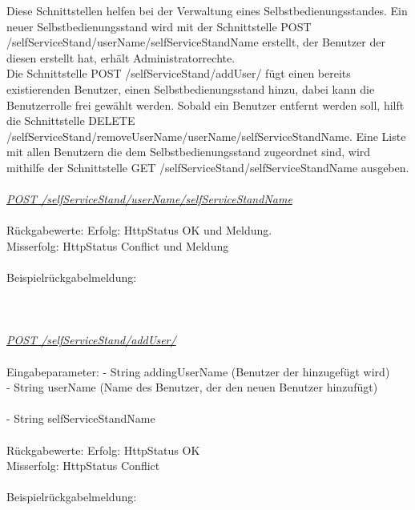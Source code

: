 Diese Schnittstellen helfen bei der Verwaltung eines Selbstbedienungsstandes. Ein neuer Selbstbedienungsstand wird mit der Schnittstelle POST /selfServiceStand/{userName}/{selfServiceStandName} erstellt, der Benutzer der diesen erstellt hat, erhält Administratorrechte.\\ Die Schnittstelle POST /selfServiceStand/addUser/ fügt einen bereits existierenden Benutzer, einen Selbstbedienungsstand hinzu, dabei kann die Benutzerrolle frei gewählt werden. Sobald ein Benutzer entfernt werden soll, hilft die Schnittstelle DELETE /selfServiceStand/{removeUserName}/{userName}/{selfServiceStandName}.
Eine Liste mit allen Benutzern die dem Selbstbedienungsstand zugeordnet sind, wird mithilfe der Schnittstelle GET /selfServiceStand/{selfServiceStandName} ausgeben.
\\
\\
\textit{\underline{POST /selfServiceStand/{userName}/{selfServiceStandName}}}
\\
\\
Rückgabewerte: \tab 					Erfolg: HttpStatus OK und Meldung.\\
\tab \tab 								Misserfolg: HttpStatus Conflict und Meldung\\
\\
Beispielrückgabelmeldung:	
\\
\\
\\
\\
\textit{\underline{POST /selfServiceStand/addUser/}}
\\
\\
Eingabeparameter: \tab			- String addingUserName (Benutzer der hinzugefügt wird)\\
\tab \tab                        		- String userName (Name des Benutzer, der den neuen Benutzer hinzufügt)\\\\
\tab \tab                        		- String selfServiceStandName\\                 
\\
Rückgabewerte: \tab 					Erfolg: HttpStatus OK \\
\tab \tab 								Misserfolg: HttpStatus Conflict \\
\\
Beispielrückgabelmeldung:	
\\
\\
